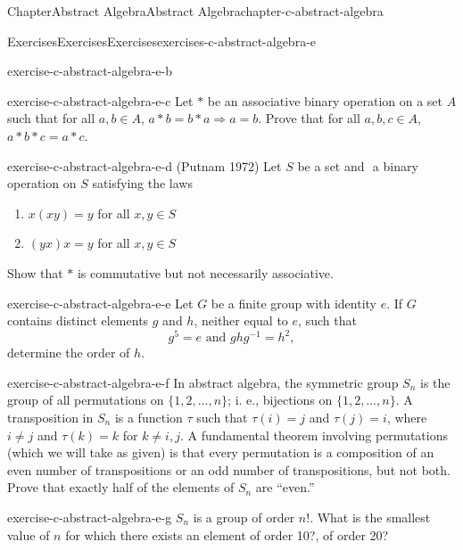 \documentclass[oneside,10pt,]{book}
\numberwithin{equation}{section}
\begin{document}
\begin{chapterptx}{Chapter}{Abstract Algebra}{}{Abstract Algebra}{}{}{chapter-c-abstract-algebra}
\begin{exercises-section}{Exercises}{Exercises}{}{Exercises}{}{}{exercises-c-abstract-algebra-e}
\begin{divisionexercise}{1}{}{}{exercise-c-abstract-algebra-e-b}
%
\end{divisionexercise}%
\begin{divisionexercise}{2}{}{}{exercise-c-abstract-algebra-e-c}%
Let \(*\) be an associative binary operation on a set \(A\) such that for all \(a, b \in A\), \(a*b=b*a \Rightarrow a=b\).  Prove that for all \(a, b, c \in A\), \(a*b*c = a*c\).%
\end{divisionexercise}%
\begin{divisionexercise}{3}{}{}{exercise-c-abstract-algebra-e-d}%
(Putnam 1972) Let \(S\) be a set and \(\) a binary operation on \(S\) satisfying the laws%
\begin{enumerate}[label=(\roman*)]
\item{}\(x(xy)=y\) for all \(x,y \in S\)%
\item{}\((yx)x=y\) for all \(x,y \in S\)%
\end{enumerate}
Show that \(*\) is commutative but not necessarily associative.%
\end{divisionexercise}%
\begin{divisionexercise}{4}{}{}{exercise-c-abstract-algebra-e-e}%
Let \(G\) be a finite group with identity \(e\).  If \(G\) contains distinct elements \(g\) and \(h\), neither equal to \(e\), such that%
\begin{equation*}
g^5=e \textrm{  and  }g h g^{-1} = h^2,
\end{equation*}
determine the order of \(h\).%
\end{divisionexercise}%
\begin{divisionexercise}{5}{}{}{exercise-c-abstract-algebra-e-f}%
%
In abstract algebra, the symmetric group \(S_n\) is the group of all permutations on \(\{1, 2, \dots, n\}\); i. e., bijections on \(\{1, 2, \dots, n\}\).  A transposition in \(S_n\) is a function \(\tau\) such that \(\tau(i)=j\) and \(\tau(j)=i\), where \(i \neq j\) and \(\tau(k)=k\) for \(k \neq i, j\).  A fundamental theorem involving permutations (which we will take as given) is that every permutation is a composition of an even number of transpositions or  an odd number of transpositions, but not both.   Prove that exactly half of the elements of \(S_n\) are ``even.''%
\end{divisionexercise}%
\begin{divisionexercise}{6}{}{}{exercise-c-abstract-algebra-e-g}%
\(S_n\) is a group of order \(n!\).  What is the smallest value of \(n\) for which there exists an element of order 10?, of order 20?%
\end{divisionexercise}%

\end{exercises-section}
\end{chapterptx}
\end{document}
